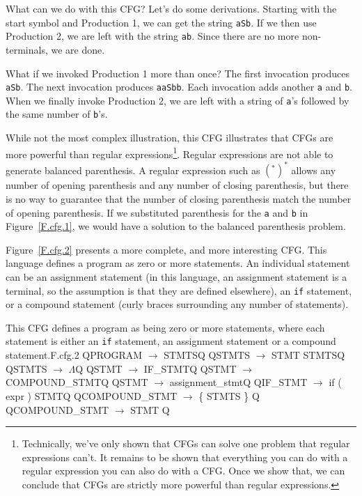 \documentclass[letterpaper,12pt,openany,reqno]{book}%
\newcommand{\code}[1] {\lstinline[breaklines=yes,breakatwhitespace=yes]{#1}}
\newcommand{\cfgprod}[2] {{\ttfamily #1} $\rightarrow$ {\ttfamily #2}}
\begin{document}
What can we do with this CFG? Let's do some derivations. Starting with the start symbol and Production 1, we can get the string \code{aSb}. If we then use Production 2, we are left with the string \code{ab}. Since there are no more non-terminals, we are done.

What if we invoked Production 1 more than once? The first invocation produces \code{aSb}. The next invocation produces \code{aaSbb}. Each invocation adds another \code{a} and \code{b}. When we finally invoke Production 2, we are left with a string of \code{a}'s followed by the same number of \code{b}'s.

While not the most complex illustration, this CFG illustrates that CFGs are more powerful than regular expressions\footnote{Technically, we've only shown that CFGs can solve one problem that regular expressions can't. It remains to be shown that everything you can do with a regular expression you can also do with a CFG. Once we show that, we can conclude that CFGs are strictly more powerful than regular expressions.}. Regular expressions are not able to generate balanced parenthesis. A regular expression such as $(^*)^*$ allows any number of opening parenthesis and any number of closing parenthesis, but there is no way to guarantee that the number of closing parenthesis match the number of opening parenthesis. If we substituted parenthesis for the \code{a} and \code{b} in Figure~\ref{F.cfg.1}, we would have a solution to the balanced parenthesis problem.

Figure~\ref{F.cfg.2} presents a more complete, and more interesting CFG. This language defines a program as zero or more statements. An individual statement can be an assignment statement (in this language, an assignment statement is a terminal, so the assumption is that they are defined elsewhere), an \code{if} statement, or a compound statement (curly braces surrounding any number of statements). 

\begin{cfg}{This CFG defines a program as being zero or more statements, where each statement is either an \code{if} statement, an assignment statement or a compound statement.}{F.cfg.2}
Q\cfgprod{PROGRAM}{STMTS}Q
Q\cfgprod{STMTS}{STMT STMTS}Q
Q\cfgprod{STMTS}{$\Lambda$}Q
Q\cfgprod{STMT}{IF\_STMT}Q
Q\cfgprod{STMT}{COMPOUND\_STMT}Q
Q\cfgprod{STMT}{assignment\_stmt}Q
Q\cfgprod{IF\_STMT} {if ( expr ) STMT}Q
Q\cfgprod{COMPOUND\_STMT} { \{ STMTS \} }Q
Q\cfgprod{COMPOUND\_STMT} { STMT }Q
\end{cfg}
\end{document}

